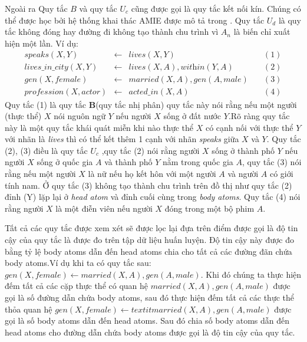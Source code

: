 Ngoài ra Quy tắc \(B\) và quy tắc \(U_c\) cũng được gọi là quy tắc kết nối kín. Chúng có thể được học bởi hệ thống khai thác AMIE được mô tả trong \cite{AMIE,galarraga2015fast}. Quy tắc \(U_d\) là quy tắc không đóng hay đường đi không tạo thành chu trình vì \(A_n\) là biến chỉ xuất hiện một lần. Ví dụ:
\[
\begin{matrix}
\textit{speaks}(X, Y ) & \gets & \textit{lives}(X, Y) & \quad (1) \\
\textit{lives\_in\_city}(X, Y ) & \gets & \textit{lives}(X, A),\textit{within}(Y, A)  & \quad  (2) \\
\textit{gen}(X, female) & \gets & \textit{married}(X, A), \textit{gen}(A, male)  & \quad  (3) \\
\textit{profession}(X, actor) &  \gets & \textit{acted\_in}(X, A)  & \quad (4)
\end{matrix}
\]
Quy tắc (1) là quy tắc \textbf{B}(quy tắc nhị phân) quy tắc này nói rằng nếu một người (thực thể) \(X\) nói nguôn ngữ \(Y\) nếu người \(X\) sống  ở đất nước \(Y\).Rõ ràng quy tắc này là một quy tắc khái quát miễn khi nào thực thể \(X\) có cạnh nối với thực thể \(Y\) với nhãn là \textit{lives} thì có thể kết thêm 1 cạnh với nhãn \textit{speaks} giữa \(X\) và \(Y\). Quy tắc (2), (3) điều là quy tắc \(U_c\) ,quy tắc (2) nói rằng người \(X\) sống ở thành phố \(Y\) nếu người \(X\) sống ở quốc gia \(A\) và thành phố \(Y\) nằm trong quốc gia \(A\), quy tắc (3) nói rằng nếu một người \(X\) là nữ nếu họ kết hôn với một người \(A\) và người \(A\) có giới tính nam. Ở quy tắc (3) không tạo thành chu trình trên đồ thị như quy tắc (2) đỉnh (Y) lặp lại  ở \textit{head atom} và đỉnh cuối cùng trong \textit{body atoms}. Quy tắc (4) nói rằng người \(X\) là một điễn viên nếu người \(X\) đóng trong một bộ phim \(A\).

Tất cả các quy tắc được xem xét sẽ được lọc lại đựa trên điểm được gọi là độ tin cậy của quy tắc là được đo trên tập dữ liệu huấn luyện. Độ tin cậy này được đo bằng tỷ lệ body atoms dẫn đến head atoms chia cho tất cả các đường đãn chứa body atoms.Ví dụ khi ta có quy tắc sau:
\(\textit{gen}(X, female) \gets \textit{married}(X, A), \textit{gen}(A, male) \). Khi đó chúng ta thực hiện đếm tất cả các cặp thực thể có quan hệ  \(\textit{married}(X, A), \textit{gen}(A, male) \) được gọi là số đường dẫn chứa body atoms, sau đó thực hiện đếm tất cả các  thực thể thỏa quan hệ \(\textit{gen}(X, female) \gets textit{married}(X, A), \textit{gen}(A, male) \) được gọi là số body atoms dẫn đến head atoms. Sau đó chia số body atoms dẫn đến head atoms cho  đường dẫn chứa body atoms được gọi là độ tin cậy của quy tắc.
